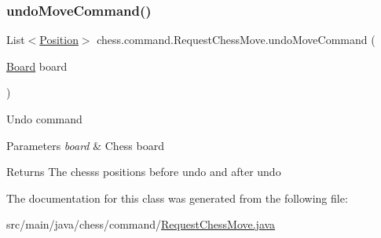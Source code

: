 \subsubsection{\texorpdfstring{undo\+Move\+Command()}{undoMoveCommand()}}
{\footnotesize\ttfamily List$<$\mbox{\hyperlink{classchess_1_1models_1_1_position}{Position}}$>$ chess.\+command.\+Request\+Chess\+Move.\+undo\+Move\+Command (\begin{DoxyParamCaption}\item[{\mbox{\hyperlink{classchess_1_1models_1_1_board}{Board}}}]{board }\end{DoxyParamCaption})}

Undo command


\begin{DoxyParams}{Parameters}
{\em board} & Chess board \\
\hline
\end{DoxyParams}
\begin{DoxyReturn}{Returns}
The chess\textquotesingle{}s positions before undo and after undo 
\end{DoxyReturn}


The documentation for this class was generated from the following file\+:\begin{DoxyCompactItemize}
\item 
src/main/java/chess/command/\mbox{\hyperlink{_request_chess_move_8java}{Request\+Chess\+Move.\+java}}\end{DoxyCompactItemize}
